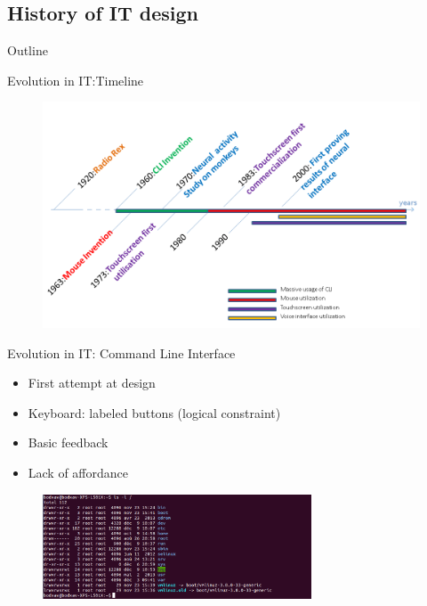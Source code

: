 \documentclass{beamer}
\begin{document}
\subsection{History of IT design}

\begin{frame}{Outline}
\end{frame}

\begin{frame}{Evolution in IT:Timeline}
\begin{figure}
\centering
\includegraphics[scale=0.3]{timeline-interface_2.png}
\end{figure}
\end{frame}

\begin{frame}{Evolution in IT: Command Line Interface}

\begin{itemize}
\item First attempt at design
\item Keyboard: labeled buttons (logical constraint)
\item Basic feedback
\item Lack of affordance
\end{itemize}
	\begin{figure}
			  \begin{minipage}{5cm}
				  \includegraphics[width=8cm]{terminal.png}
			  \end{minipage}

		\end{figure}
\end{frame}
\end{document}
